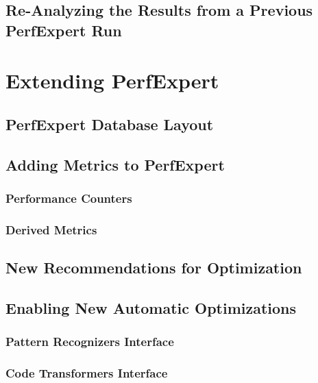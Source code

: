 \section{Re-Analyzing the Results from a Previous PerfExpert Run}

\chapter{Extending PerfExpert}
\label{extending}

\section{PerfExpert Database Layout}

\section{Adding Metrics to PerfExpert}

\subsection{Performance Counters}

\subsection{Derived Metrics}

\section{New Recommendations for Optimization}

\section{Enabling New Automatic Optimizations}

\subsection{Pattern Recognizers Interface}

\subsection{Code Transformers Interface}
